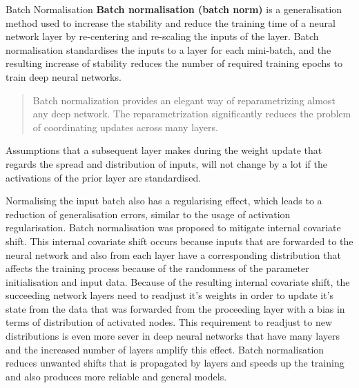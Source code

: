   \begin{pabox}{Batch Normalisation}
  \label{def:batch-normalisation-definition}
    \textbf{Batch normalisation (batch norm)} is a generalisation method used to increase the stability and reduce the training time of a neural network layer by re-centering and re-scaling the inputs of the layer.
    Batch normalisation standardises the inputs to a layer for each mini-batch, and the resulting increase of stability reduces the number of required training epochs to train deep neural networks.

    \begin{quote}
      Batch normalization provides an elegant way of reparametrizing almost any deep network. 
      The reparametrization significantly reduces the problem of coordinating updates across many layers.
      \cite{goodfellowDeepLearning2016}
    \end{quote}
    Assumptions that a subsequent layer makes during the weight update that regards the spread and distribution of inputs, will not change by a lot if the activations of the prior layer are standardised. 
  \end{pabox}
  Normalising the input batch also has a regularising effect, which leads to a reduction of generalisation errors, similar to the usage of activation regularisation.
  Batch normalisation was proposed to mitigate internal covariate shift. This internal covariate shift occurs because inputs that are forwarded to the neural network and also from each layer have a corresponding distribution that affects the training process because of the randomness of the parameter initialisation and input data.
  Because of the resulting internal covariate shift, the succeeding network layers need to readjust it's weights in order to update it's state from the data that was forwarded from the proceeding layer with a bias in terms of distribution of activated nodes. This requirement to readjust to new distributions is even more sever in deep neural networks that have many layers and the increased number of layers amplify this effect. Batch normalisation reduces unwanted shifts that is propagated by layers and speeds up the training and also produces more reliable and general models.
  


